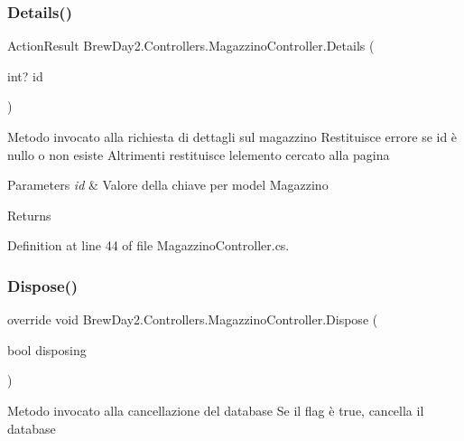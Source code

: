 \subsubsection{\texorpdfstring{Details()}{Details()}}
{\footnotesize\ttfamily Action\+Result Brew\+Day2.\+Controllers.\+Magazzino\+Controller.\+Details (\begin{DoxyParamCaption}\item[{int?}]{id }\end{DoxyParamCaption})}



Metodo invocato alla richiesta di dettagli sul magazzino Restituisce errore se id è nullo o non esiste Altrimenti restituisce l\textquotesingle{}elemento cercato alla pagina 


\begin{DoxyParams}{Parameters}
{\em id} & Valore della chiave per model Magazzino\\
\hline
\end{DoxyParams}
\begin{DoxyReturn}{Returns}

\end{DoxyReturn}


Definition at line 44 of file Magazzino\+Controller.\+cs.

\mbox{\label{class_brew_day2_1_1_controllers_1_1_magazzino_controller_abc1d041b34327990c17bd1d410af61c5}} 
\subsubsection{\texorpdfstring{Dispose()}{Dispose()}}
{\footnotesize\ttfamily override void Brew\+Day2.\+Controllers.\+Magazzino\+Controller.\+Dispose (\begin{DoxyParamCaption}\item[{bool}]{disposing }\end{DoxyParamCaption})\hspace{0.3cm}{\ttfamily [protected]}}



Metodo invocato alla cancellazione del database Se il flag è true, cancella il database 


